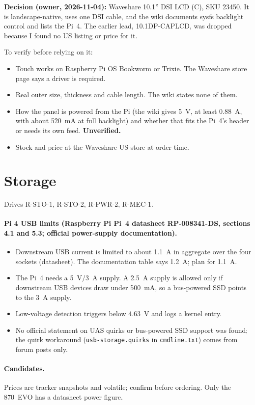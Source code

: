 \documentclass[11pt,a4paper]{article}
\begin{document}
\textbf{Decision (owner, 2026-11-04):} Waveshare 10.1'' DSI LCD (C), SKU 23450. It is landscape-native, uses one DSI cable, and the wiki documents sysfs backlight control and lists the Pi~4. The earlier lead, 10.1DP-CAPLCD, was dropped because I found no US listing or price for it.

To verify before relying on it:
\begin{itemize}
  \item Touch works on Raspberry Pi OS Bookworm or Trixie. The Waveshare store page says a driver is required.
  \item Real outer size, thickness and cable length. The wiki states none of them.
  \item How the panel is powered from the Pi (the wiki gives 5~V, at least 0.88~A, with about 520~mA at full backlight) and whether that fits the Pi~4's header or needs its own feed. \textbf{Unverified.}
  \item Stock and price at the Waveshare US store at order time.
\end{itemize}

\section{Storage}
Drives R-STO-1, R-STO-2, R-PWR-2, R-MEC-1.

\paragraph{Pi 4 USB limits (Raspberry Pi Pi~4 datasheet RP-008341-DS, sections 4.1 and 5.3; official power-supply documentation).}
\begin{itemize}
  \item Downstream USB current is limited to about 1.1~A in aggregate over the four sockets (datasheet). The documentation table says 1.2~A; plan for 1.1~A.
  \item The Pi~4 needs a 5~V/3~A supply. A 2.5~A supply is allowed only if downstream USB devices draw under 500~mA, so a bus-powered SSD points to the 3~A supply.
  \item Low-voltage detection triggers below 4.63~V and logs a kernel entry.
  \item No official statement on UAS quirks or bus-powered SSD support was found; the quirk workaround (\texttt{usb-storage.quirks} in \texttt{cmdline.txt}) comes from forum posts only.
\end{itemize}

\paragraph{Candidates.} Prices are tracker snapshots and volatile; confirm before ordering. Only the 870~EVO has a datasheet power figure.
\end{document}
